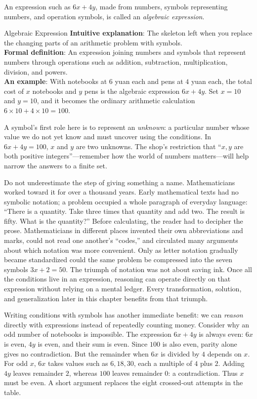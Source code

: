 An expression such as $6x+4y$, made from numbers, symbols representing numbers, and operation symbols, is called an \emph{algebraic expression}.

\begin{shuyu}{Algebraic Expression}
\textbf{Intuitive explanation}: The skeleton left when you replace the changing parts of an arithmetic problem with symbols.\\
\textbf{Formal definition}: An expression joining numbers and symbols that represent numbers through operations such as addition, subtraction, multiplication, division, and powers.\\
\textbf{An example}: With notebooks at $6$ yuan each and pens at $4$ yuan each, the total cost of $x$ notebooks and $y$ pens is the algebraic expression $6x+4y$. Set $x=10$ and $y=10$, and it becomes the ordinary arithmetic calculation $6\times10+4\times10=100$.
\end{shuyu}

A symbol's first role here is to represent an \emph{unknown}: a particular number whose value we do not yet know and must uncover using the conditions. In $6x+4y=100$, $x$ and $y$ are two unknowns. The shop's restriction that ``$x,y$ are both positive integers''---remember how the world of numbers matters---will help narrow the answers to a finite set.

Do not underestimate the step of giving something a name. Mathematicians worked toward it for over a thousand years. Early mathematical texts had no symbolic notation; a problem occupied a whole paragraph of everyday language: ``There is a quantity. Take three times that quantity and add two. The result is fifty. What is the quantity?'' Before calculating, the reader had to decipher the prose. Mathematicians in different places invented their own abbreviations and marks, could not read one another's ``codes,'' and circulated many arguments about which notation was more convenient. Only as letter notation gradually became standardized could the same problem be compressed into the seven symbols $3x+2=50$. The triumph of notation was not about saving ink. Once all the conditions live in an expression, reasoning can operate directly on that expression without relying on a mental ledger. Every transformation, solution, and generalization later in this chapter benefits from that triumph.

Writing conditions with symbols has another immediate benefit: we can \emph{reason} directly with expressions instead of repeatedly counting money. Consider why an odd number of notebooks is impossible. The expression $6x+4y$ is always even: $6x$ is even, $4y$ is even, and their sum is even. Since $100$ is also even, parity alone gives no contradiction. But the remainder when $6x$ is divided by $4$ depends on $x$. For odd $x$, $6x$ takes values such as $6,18,30$, each a multiple of $4$ plus $2$. Adding $4y$ leaves remainder $2$, whereas $100$ leaves remainder $0$: a contradiction. Thus $x$ must be even. A short argument replaces the eight crossed-out attempts in the table.

